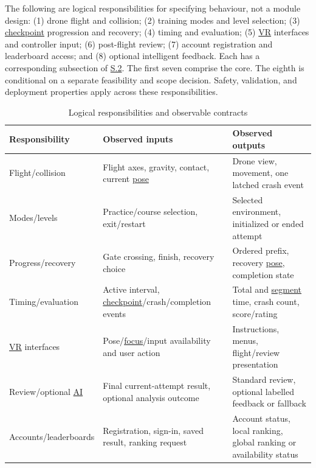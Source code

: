 \documentclass[12pt]{article}
\begin{document}
The following are logical responsibilities for specifying behaviour, not a
module design: (1) drone flight and collision; (2) training modes and level
selection; (3) \hyperlink{glos:Checkpoint}{checkpoint} progression and recovery; (4) timing and evaluation;
(5) \hyperlink{glos:VR}{VR} interfaces and controller input; (6) post-flight review; (7) account
registration and leaderboard access; and (8) optional intelligent feedback.
Each has a corresponding subsection of \hyperref[s2]{S.2}. The first seven
comprise the core. The eighth is conditional on a separate feasibility and
scope decision. Safety, validation, and deployment properties apply across
these responsibilities.

\begin{table}[htbp]\centering\small
\caption{Logical responsibilities and observable contracts}\label{tab:logical}
\begin{tabularx}{\textwidth}{@{}p{}YY@{}}\toprule
Responsibility & Observed inputs & Observed outputs \\ \midrule
Flight/collision & Flight axes, gravity, contact, current \hyperlink{glos:Tracking}{pose} & Drone view,
movement, one latched crash event \\
Modes/levels & Practice/course selection, exit/restart & Selected environment,
initialized or ended attempt \\
Progress/recovery & Gate crossing, finish, recovery choice & Ordered prefix,
recovery \hyperlink{glos:Tracking}{pose}, completion state \\
Timing/evaluation & Active interval, \hyperlink{glos:Checkpoint}{checkpoint}/crash/completion events & Total
and \hyperlink{glos:Checkpoint}{segment} time, crash count, score/rating \\
\hyperlink{glos:VR}{VR} interfaces & Pose/\hyperlink{glos:Focus}{focus}/input availability and user action & Instructions,
menus, flight/review presentation \\
Review/optional \hyperlink{glos:AI}{AI} & Final current-attempt result, optional analysis outcome &
Standard review, optional labelled feedback or fallback \\
Accounts/leaderboards & Registration, sign-in, saved result, ranking request &
Account status, local ranking, global ranking or availability status \\
\bottomrule\end{tabularx}\end{table}
\end{document}
